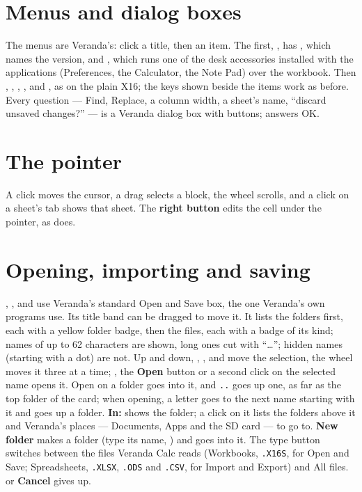 \section{Menus and dialog boxes}

The menus are Veranda's: click a title, then an item. The first,
, has , which names
the version, and , which runs one of the desk
accessories installed with the applications (Preferences, the
Calculator, the Note Pad) over the workbook. Then ,
, , ,  and
, as on the plain X16; the keys shown beside the items
work as before. Every question --- Find, Replace, a column width, a
sheet's name, ``discard unsaved changes?'' --- is a Veranda dialog box with
buttons;  answers OK.

\section{The pointer}

A click moves the cursor, a drag selects a block, the wheel scrolls, and a
click on a sheet's tab shows that sheet. The \textbf{right button} edits
the cell under the pointer, as  does.

\section{Opening, importing and saving}

, ,  and  use Veranda's standard Open and Save
box, the one Veranda's own programs use. Its title band can be dragged
to move it. It lists the folders first, each with a yellow folder badge,
then the files, each with a badge of its kind; names of up to 62
characters are shown, long ones cut with ``\ldots''; hidden names
(starting with a dot) are not. Up and down, , ,
 and  move the selection, the wheel moves it three at a
time; , the \textbf{Open} button or a second click on the
selected name opens it. Open on a folder goes into it, and \texttt{..}
goes up one, as far as the top folder of the card; when opening, a letter
goes to the next name starting with it and  goes up a
folder. \textbf{In:} shows the folder; a click on it lists the folders
above it and Veranda's places --- Documents, Apps and the SD card --- to go
to. \textbf{New folder} makes a folder (type its name, ) and
goes into it. The type button switches between the files Veranda Calc
reads (\textsf{Workbooks}, \texttt{.X16S}, for Open and Save; \textsf{
Spreadsheets}, \texttt{.XLSX}, \texttt{.ODS} and \texttt{.CSV}, for Import
and Export) and \textsf{All files}.  or \textbf{Cancel} gives
up.

